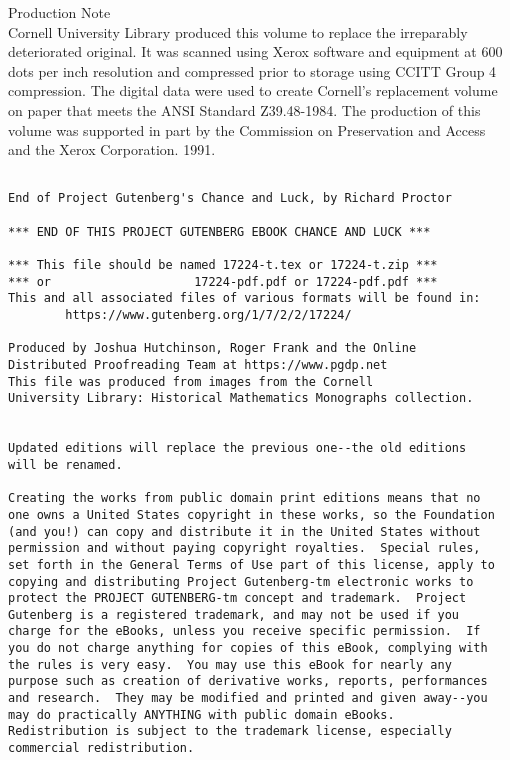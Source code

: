 \documentclass[letterpaper,12pt,oneside,openany]{memoir}
\begin{document}
\clearpage
\noindent
Production Note\\[5mm]
Cornell University Library produced this volume to replace
the irreparably deteriorated original. It was scanned using
Xerox software and equipment at 600 dots per inch resolution
and compressed prior to storage using CCITT Group 4
compression. The digital data were used to create Cornell's
replacement volume on paper that meets the ANSI Standard
Z39.48-1984. The production of this volume was supported in
part by the Commission on Preservation and Access and the
Xerox Corporation. 1991.
\newpage

\small
{}
\begin{verbatim}

End of Project Gutenberg's Chance and Luck, by Richard Proctor

*** END OF THIS PROJECT GUTENBERG EBOOK CHANCE AND LUCK ***

*** This file should be named 17224-t.tex or 17224-t.zip ***
*** or                    17224-pdf.pdf or 17224-pdf.pdf ***
This and all associated files of various formats will be found in:
        https://www.gutenberg.org/1/7/2/2/17224/

Produced by Joshua Hutchinson, Roger Frank and the Online
Distributed Proofreading Team at https://www.pgdp.net
This file was produced from images from the Cornell
University Library: Historical Mathematics Monographs collection.


Updated editions will replace the previous one--the old editions
will be renamed.

Creating the works from public domain print editions means that no
one owns a United States copyright in these works, so the Foundation
(and you!) can copy and distribute it in the United States without
permission and without paying copyright royalties.  Special rules,
set forth in the General Terms of Use part of this license, apply to
copying and distributing Project Gutenberg-tm electronic works to
protect the PROJECT GUTENBERG-tm concept and trademark.  Project
Gutenberg is a registered trademark, and may not be used if you
charge for the eBooks, unless you receive specific permission.  If
you do not charge anything for copies of this eBook, complying with
the rules is very easy.  You may use this eBook for nearly any
purpose such as creation of derivative works, reports, performances
and research.  They may be modified and printed and given away--you
may do practically ANYTHING with public domain eBooks.
Redistribution is subject to the trademark license, especially
commercial redistribution.




\end{verbatim}
\end{document}
